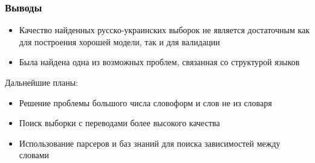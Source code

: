 \documentclass[10pt,pdf,hyperref={unicode}]{beamer}
\begin{document}
\begin{frame}
	
	\frametitle{Выводы}
	
	\begin{itemize}
		\item
			Качество найденных русско-украинских выборок не является достаточным как для построения хорошей модели, так и для валидации	
		\item
			Была найдена одна из возможных проблем, связанная со структурой языков
	\end{itemize}
	
	Дальнейшие планы:
	\begin{itemize}
		\item Решение проблемы большого числа словоформ и слов не из словаря
		
		\item Поиск выборки с переводами более высокого качества
		
		\item Использование парсеров и баз знаний для поиска зависимостей между словами
	\end{itemize}
	
\end{frame}
\end{document}
